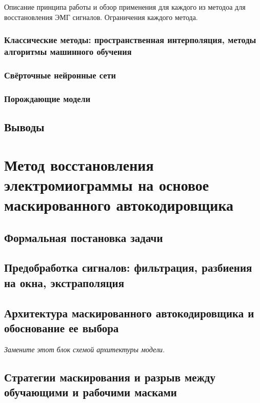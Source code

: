 \documentclass[14pt,a4paper]{extarticle}
\newcommand{\placeholderfigure}[3]{%
  \begin{minipage}[c][#2][c]{#1}
    \centering
    \fbox{\begin{minipage}[c][#2][c]{0.96\linewidth}
      \centering\itshape #3
    \end{minipage}}
  \end{minipage}%
}
\begin{document}
Описание принципа работы и обзор применения для каждого из методоа для
восстановления ЭМГ сигналов. Ограничения каждого метода.

\subsubsection{Классические методы: пространственная интерполяция, методы алгоритмы машинного обучения}

\subsubsection{Свёрточные нейронные сети}

\subsubsection{Порождающие модели}

\subsection{Выводы}

\section{Метод восстановления электромиограммы на основое маскированного автокодировщика}

\subsection{Формальная постановка задачи}

\subsection{Предобработка сигналов: фильтрация, разбиения на окна, экстраполяция}

\subsection{Архитектура маскированного автокодировщика и обоснование ее выбора}

\begin{center}\textit{Замените этот блок схемой архитектуры модели.}\end{center}

\subsection{Стратегии маскирования и разрыв между обучающими и рабочими масками}
\end{document}
